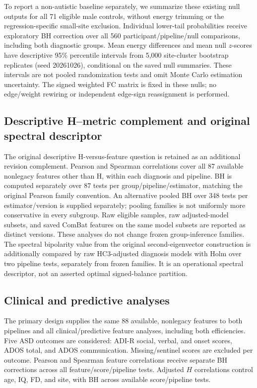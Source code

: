 \documentclass[10pt,letterpaper]{article}
\begin{document}
To report a non-autistic baseline separately, we summarize these existing null
outputs for all 71 eligible male controls, without energy trimming or the
regression-specific small-site exclusion. Individual lower-tail probabilities
receive exploratory BH correction over all 560 participant/pipeline/null
comparisons, including both diagnostic groups. Mean energy differences and mean null $z$-scores have descriptive
95\% percentile intervals from 5,000 site-cluster bootstrap replicates
(seed 20261026), conditional on the saved null summaries. These intervals are
not pooled randomization tests and omit Monte Carlo estimation uncertainty.
The signed weighted FC matrix is fixed in these nulls; no edge/weight rewiring
or independent edge-sign reassignment is performed.

\subsection*{Descriptive H--metric complement and original spectral descriptor}
The original descriptive H-versus-feature question is retained as an additional
revision complement. Pearson and Spearman correlations cover all 87 available
nonlegacy features other than H, within each diagnosis and pipeline. BH is
computed separately over 87 tests per group/pipeline/estimator, matching the
original Pearson family convention. An alternative pooled BH over 348 tests per
estimator/version is supplied separately; pooling families is not uniformly more
conservative in every subgroup. Raw eligible samples, raw adjusted-model subsets,
and saved ComBat features on the same model subsets are reported as distinct
versions. These analyses do not change frozen group-inference families.
The spectral bipolarity value from the original second-eigenvector construction
is additionally compared by raw HC3-adjusted diagnosis models with Holm over
two pipeline tests, separately from frozen families. It is an operational
spectral descriptor, not an asserted optimal signed-balance partition.

\subsection*{Clinical and predictive analyses}
The primary design supplies the same 88 available, nonlegacy features to both
pipelines and all clinical/predictive feature analyses, including both efficiencies.
Five ASD outcomes are considered: ADI-R social, verbal, and onset scores, ADOS
total, and ADOS communication. Missing/sentinel scores are excluded per outcome.
Pearson and Spearman feature correlations receive separate BH corrections across
all feature/score/pipeline tests. Adjusted $H$ correlations control age, IQ, FD,
and site, with BH across available score/pipeline tests.
\end{document}

